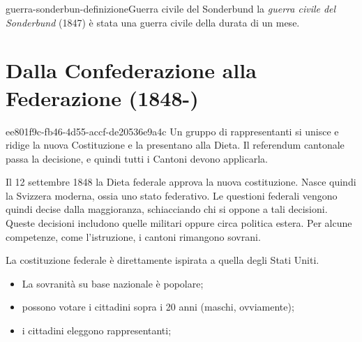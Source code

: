 \documentclass[preview]{standalone}
\begin{document}
\begin{snippetdefinition}{guerra-sonderbun-definizione}{Guerra civile del Sonderbund}
    la \textit{guerra civile del Sonderbund} (1847) è stata una guerra civile
    della durata di un mese.
\end{snippetdefinition}


\section{Dalla Confederazione alla Federazione (1848-)}

\begin{snippet}{ee801f9c-fb46-4d55-accf-de20536e9a4c}
    Un gruppo di rappresentanti si unisce e ridige la nuova Costituzione e la presentano alla Dieta.
    Il referendum cantonale passa la decisione, e quindi tutti i Cantoni devono applicarla.
    
    Il 12 settembre 1848 la Dieta federale approva la nuova costituzione.
    Nasce quindi la Svizzera moderna, ossia uno stato federativo.
    Le questioni federali vengono quindi decise dalla maggioranza, schiacciando chi si oppone a tali decisioni.
    Queste decisioni includono quelle militari oppure circa politica estera.
    Per alcune competenze, come l'istruzione, i cantoni rimangono sovrani.
    
    La costituzione federale è direttamente ispirata a quella degli Stati Uniti.
    \begin{itemize}
        \item La sovranità su base nazionale è popolare;
        \item possono votare i cittadini sopra i 20 anni (maschi, ovviamente);
        \item i cittadini eleggono rappresentanti;
    \end{itemize}
    
\end{snippet}
\end{document}
